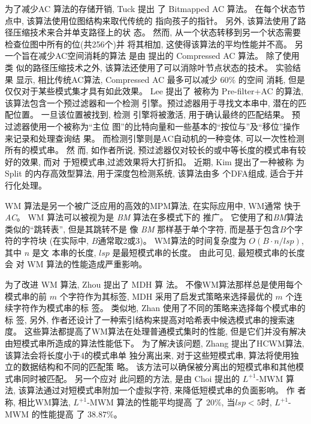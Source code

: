 为了减少\textsf{AC} 算法的存储开销, Tuck \cite{Tuck2004} 提出
了 Bitmapped AC 算法。 在每个状态节点中, 该算法使用位图结构来取代传统的
指向孩子的指针。 另外, 该算法使用了路径压缩技术来合并单支路径上的状
态。 然而, 从一个状态转移到另一个状态需要检查位图中所有的位(共256个)并
将其相加, 这使得该算法的平均性能并不高。 另一个旨在减少AC空间消耗的算法
是由 \cite{Bremler2011} 提出的 \textsf{Compressed AC} 算法。 除了使用类
似的路径压缩技术之外, 该算法还使用了可以消除叶节点状态的技术。 实验结果
显示, 相比传统AC算法, \textsf{Compressed AC} 最多可以减少 $60\%$ 的空间
消耗, 但是仅仅对于某些模式集才具有如此效果。 Lee \cite{Lee2013} 提出了
被称为 \textsf{Pre-filter+AC} 的算法, 该算法包含一个预过滤器和一个检测
引擎。预过滤器用于寻找文本串中, 潜在的匹配位置。 一旦该位置被找到, 检测
引擎将被激活, 用于确认最终的匹配结果。 预过滤器使用一个被称为“主位
图”的比特向量和一些基本的“按位与”及“移位”操作来记录和处理查询结
果。 而检测引擎则是AC自动机的一种变体, 可以一次性检测所有的模式串。 然
而, 如作者所说, 预过滤器仅对较长的或中等长度的模式串有较好的效果, 而对
于短模式串,过滤效果将大打折扣。 近期, Kim \cite{Kim2015} 提出了一种被称
为 \textsf{Split} 的内存高效型算法, 用于深度包检测系统, 该算法由多
个DFA组成, 适合于并行化处理。

\textsf{WM} 算法是另一个被广泛应用的高效的MPM算法, 在实际应用中, WM通常
快于\emph{AC}。 \textsf{WM} 算法可以被视为是 \emph{BM} 算法在多模式下的
推广。 它使用了和\emph{BM}算法类似的“跳转表”, 但是其跳转不是
像 \emph{BM} 那样基于单个字符, 而是基于包含$B$个字符的字符块 (在实际中,
$B$通常取2或3)。 WM算法的时间复杂度为 $O(B \cdot n/lsp)$, 其中 $n$ 是文
本串的长度, $lsp$ 是最短模式串的长度。 由此可见, 最短模式串的长度会
对 WM 算法的性能造成严重影响。

为了改进 \textsf{WM} 算法, Zhou \cite{Zhou2007} 提出了 \textsf{MDH} 算
法。 不像WM算法那样总是使用每个模式串的前 $m$ 个字符作为其标签,
\textsf{MDH} 采用了启发式策略来选择最优的 $m$ 个连续字符作为模式串的标
签。 类似地, Zhan \cite{Zhan2014} 使用了不同的策略来选择每个模式串的标
签, 另外, 作者还设计了一种索引结构来提高对哈希表中候选模式串的搜索速
度。 这些算法都提高了WM算法在处理普通模式集时的性能, 但是它们并没有解决
由短模式串所造成的算法性能低下。 为了解决该问题, Zhang
\cite{Zhang2009a}提出了\textsf{HCWM}算法, 该算法会将长度小于4的模式串单
独分离出来, 对于这些短模式串, 算法将使用独立的数据结构和不同的匹配策
略。 该方法可以确保被分离出的短模式串和其他模式串同时被匹配。 另一个应对
此问题的方法, 是由 Choi \cite{Choi2011} 提出的 \textsf{$L^{+1}$-MWM} 算
法, 该算法通过对短模式串附加一个虚拟字符, 来降低短模式串的负面影响。 作
者称, 相比WM算法, \textsf{$L^{+1}$-MWM} 算法的性能平均提高
了 $20\%$, 当$lsp < 5$时, \textsf{$L^{+1}$-MWM} 的性能提高
了 $38.87\%$。


